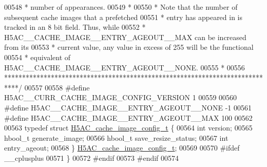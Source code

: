 \begin{DoxyCode}
00548 \textcolor{comment}{ *  number of appearances.}
00549 \textcolor{comment}{ *}
00550 \textcolor{comment}{ *  Note that the number of subsequent cache images that a prefetched}
00551 \textcolor{comment}{ *  entry has appeared in is tracked in an 8 bit field.  Thus, while}
00552 \textcolor{comment}{ *  H5AC\_\_CACHE\_IMAGE\_\_ENTRY\_AGEOUT\_\_MAX can be increased from its }
00553 \textcolor{comment}{ *  current value, any value in excess of 255 will be the functional }
00554 \textcolor{comment}{ *  equivalent of H5AC\_\_CACHE\_IMAGE\_\_ENTRY\_AGEOUT\_\_NONE.}
00555 \textcolor{comment}{ *}
00556 \textcolor{comment}{ ****************************************************************************/}
00557 
00558 \textcolor{preprocessor}{#define H5AC\_\_CURR\_CACHE\_IMAGE\_CONFIG\_VERSION   1}
00559 
00560 \textcolor{preprocessor}{#define H5AC\_\_CACHE\_IMAGE\_\_ENTRY\_AGEOUT\_\_NONE   -1}
00561 \textcolor{preprocessor}{#define H5AC\_\_CACHE\_IMAGE\_\_ENTRY\_AGEOUT\_\_MAX    100}
00562 
00563 \textcolor{keyword}{typedef} \textcolor{keyword}{struct }\hyperlink{struct_h5_a_c__cache__image__config__t}{H5AC\_cache\_image\_config\_t} \{
00564     \textcolor{keywordtype}{int}                                 version;
00565     hbool\_t                             generate\_image;
00566     hbool\_t                             save\_resize\_status;
00567     \textcolor{keywordtype}{int}                                 entry\_ageout;
00568 \} \hyperlink{struct_h5_a_c__cache__image__config__t}{H5AC\_cache\_image\_config\_t};
00569 
00570 \textcolor{preprocessor}{#ifdef \_\_cplusplus}
00571 \}
00572 \textcolor{preprocessor}{#endif}
00573 \textcolor{preprocessor}{#endif}
00574 
\end{DoxyCode}
